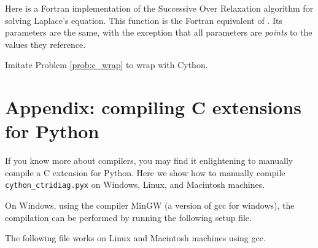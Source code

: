 Here is a Fortran implementation of the Successive Over Relaxation algorithm for solving Laplace's equation.
This function is the Fortran equivalent of .
Its parameters are the same, with the exception that all parameters are \emph{points} to the values they reference.



\begin{problem}
Imitate Problem \ref{prob:c_wrap} to wrap  with Cython.
\end{problem}


\section*{Appendix: compiling C extensions for Python}
If you know more about compilers, you may find it enlightening to manually compile a C extension for Python.
Here we show how to manually compile \texttt{cython\_ctridiag.pyx} on Windows, Linux, and Macintosh machines.

On Windows, using the compiler MinGW (a version of gcc for windows), the compilation can be performed by running the following setup file.



The following file works on Linux and Macintosh machines using gcc.



